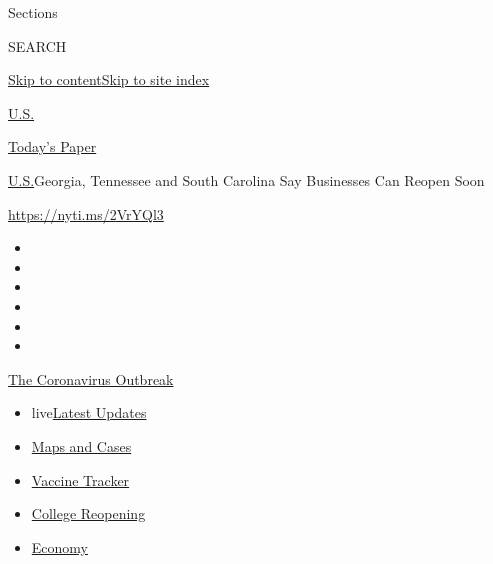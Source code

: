 Sections

SEARCH

\protect\hyperlink{site-content}{Skip to
content}\protect\hyperlink{site-index}{Skip to site index}

\href{https://www.nytimes3xbfgragh.onion/section/us}{U.S.}

\href{https://myaccount.nytimes3xbfgragh.onion/auth/login?response_type=cookie\&client_id=vi}{}

\href{https://www.nytimes3xbfgragh.onion/section/todayspaper}{Today's
Paper}

\href{/section/us}{U.S.}\textbar{}Georgia, Tennessee and South Carolina
Say Businesses Can Reopen Soon

\url{https://nyti.ms/2VrYQl3}

\begin{itemize}
\item
\item
\item
\item
\item
\item
\end{itemize}

\href{https://www.nytimes3xbfgragh.onion/news-event/coronavirus?action=click\&pgtype=Article\&state=default\&region=TOP_BANNER\&context=storylines_menu}{The
Coronavirus Outbreak}

\begin{itemize}
\tightlist
\item
  live\href{https://www.nytimes3xbfgragh.onion/2020/08/04/world/coronavirus-cases.html?action=click\&pgtype=Article\&state=default\&region=TOP_BANNER\&context=storylines_menu}{Latest
  Updates}
\item
  \href{https://www.nytimes3xbfgragh.onion/interactive/2020/us/coronavirus-us-cases.html?action=click\&pgtype=Article\&state=default\&region=TOP_BANNER\&context=storylines_menu}{Maps
  and Cases}
\item
  \href{https://www.nytimes3xbfgragh.onion/interactive/2020/science/coronavirus-vaccine-tracker.html?action=click\&pgtype=Article\&state=default\&region=TOP_BANNER\&context=storylines_menu}{Vaccine
  Tracker}
\item
  \href{https://www.nytimes3xbfgragh.onion/2020/08/02/us/covid-college-reopening.html?action=click\&pgtype=Article\&state=default\&region=TOP_BANNER\&context=storylines_menu}{College
  Reopening}
\item
  \href{https://www.nytimes3xbfgragh.onion/live/2020/08/04/business/stock-market-today-coronavirus?action=click\&pgtype=Article\&state=default\&region=TOP_BANNER\&context=storylines_menu}{Economy}
\end{itemize}

